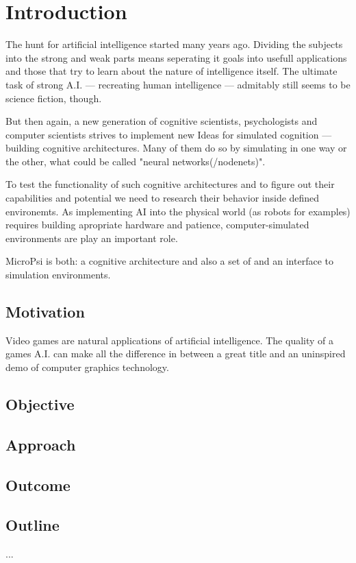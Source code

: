 \chapter{Introduction}
The hunt for artificial intelligence started many years ago. Dividing the subjects into the strong and weak parts means seperating it goals into usefull applications and those that try to learn about the nature of intelligence itself. The ultimate task of strong A.I. --- recreating human intelligence --- admitably still seems to be science fiction, though.

But then again, a new generation of cognitive scientists, psychologists and computer scientists strives to implement new Ideas for simulated cognition --- building cognitive architectures. Many of them do so by simulating in one way or the other, what could be called "neural networks(/nodenets)".

To test the functionality of such cognitive architectures and to figure out their capabilities and potential we need to research their behavior inside defined environemts. As implementing AI into the physical world (as robots for examples) requires building apropriate hardware and patience, computer-simulated environments are play an important role.

MicroPsi is both: a cognitive architecture and also a set of and an interface to simulation environments.

\section{Motivation}
Video games are natural applications of artificial intelligence. The quality of a games A.I. can make all the difference in between a great title and an uninspired demo of computer graphics technology.

\section{Objective}

\section{Approach}

\section{Outcome}


\section{Outline}
...